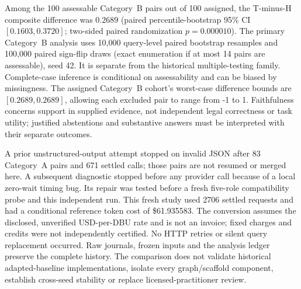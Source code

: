 Among the 100 assessable Category~B pairs out of 100 assigned, the T-minus-H composite difference was $0.2689$ (paired percentile-bootstrap 95\% CI $[0.1603, 0.3720]$; two-sided paired randomization $p=0.000010$). The primary Category~B analysis uses 10,000 query-level paired bootstrap resamples and 100,000 paired sign-flip draws (exact enumeration if at most 14 pairs are assessable), seed 42. It is separate from the historical multiple-testing family. Complete-case inference is conditional on assessability and can be biased by missingness. The assigned Category~B cohort's worst-case difference bounds are $[0.2689, 0.2689]$, allowing each excluded pair to range from -1 to 1. Faithfulness concerns support in supplied evidence, not independent legal correctness or task utility; justified abstentions and substantive answers must be interpreted with their separate outcomes.

A prior unstructured-output attempt stopped on invalid JSON after 83 Category~A pairs and 671 settled calls; those pairs are not resumed or merged here. A subsequent diagnostic stopped before any provider call because of a local zero-wait timing bug. Its repair was tested before a fresh five-role compatibility probe and this independent run. This fresh study used 2706 settled requests and had a conditional reference token cost of \$61.935583. The conversion assumes the disclosed, unverified USD-per-DBU rate and is not an invoice; fixed charges and credits were not independently certified. No HTTP retries or silent query replacement occurred. Raw journals, frozen inputs and the analysis ledger preserve the complete history. The comparison does not validate historical adapted-baseline implementations, isolate every graph/scaffold component, establish cross-seed stability or replace licensed-practitioner review.
